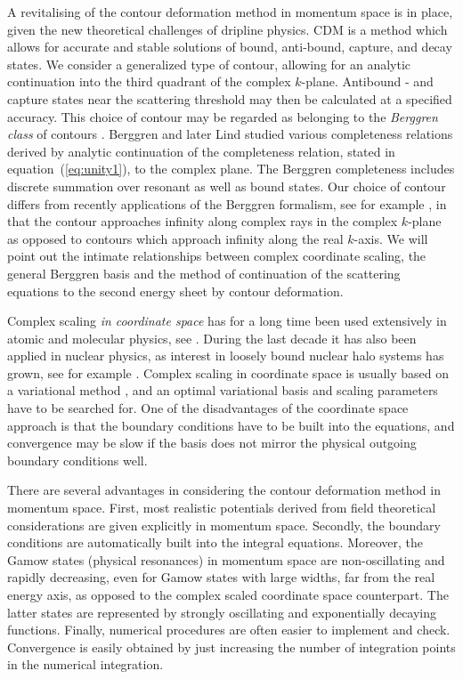 A revitalising of the contour deformation method in momentum space is in place,
given the new theoretical challenges of dripline physics.   
CDM is a method which allows for accurate and stable solutions of bound, anti-bound, capture, and 
decay states. We consider a generalized type of contour, allowing for an analytic continuation into the 
third quadrant of the complex $k$-plane. Antibound - and capture states near the scattering
threshold may then be calculated at a specified accuracy.  This choice 
of contour may be regarded as belonging to the \emph{Berggren class} of contours 
\cite{berggren}. Berggren \cite{berggren} and later Lind \cite{lind} studied various 
completeness relations derived by analytic continuation of the completeness 
relation, stated in equation~(\ref{eq:unity1}), to the complex plane. The Berggren completeness 
includes discrete summation 
over resonant as well as bound states. Our choice of contour differs from recently applications
of the Berggren formalism, see for example \cite{liotta,betan,witek1,witek2,roberto}, 
in that the contour approaches infinity along complex
rays in the complex $k$-plane as opposed to contours which approach 
infinity along the real $k$-axis.
We will point out the intimate relationships between complex coordinate scaling, the 
general Berggren basis and the method of continuation of the scattering equations to 
the second energy sheet by contour deformation.  

Complex scaling \emph{in coordinate space} has for a long time 
been used extensively in atomic and molecular physics, see
\cite{moise}. 
During the last decade it has also been applied in nuclear physics, 
as interest in loosely bound nuclear halo systems has grown, see for 
example \cite{csoto, garrido, imante}. Complex scaling 
in coordinate space is usually based on a variational method \cite{moise}, and an 
optimal variational basis and scaling parameters have to be searched for. One of the disadvantages
of the coordinate space approach is that the boundary conditions have to be 
built into the equations, and convergence may be slow if the basis does not 
mirror the physical outgoing boundary conditions well.  

There are several advantages in considering the contour deformation method 
in momentum space. First, most realistic potentials derived from field theoretical 
considerations are given explicitly in momentum space. Secondly, the boundary conditions 
are automatically built into the integral equations. Moreover, 
the Gamow states (physical resonances) \cite{kukulin} in momentum space
are non-oscillating and rapidly decreasing, even for Gamow 
states with large widths, far from the real 
energy axis,
as opposed to the complex scaled coordinate space counterpart. 
The latter states are represented by  
strongly oscillating and exponentially decaying functions. 
Finally, numerical procedures are
often easier to implement and check. Convergence is easily obtained by just increasing
the number of integration points in the numerical integration. 

